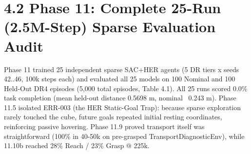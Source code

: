 \documentclass[11pt,a4paper,oneside]{book}
\begin{document}
\section{4.2 Phase 11: Complete 25-Run (2.5M-Step) Sparse Evaluation Audit}
Phase 11 trained 25 independent sparse SAC+HER agents (5 DR tiers x seeds 42..46, 100k steps each) and evaluated all 25 models on 100 Nominal and 100 Held-Out DR4 episodes (5,000 total episodes, Table 4.1). All 25 runs scored 0.0\% task completion (mean held-out distance 0.5698 m, nominal ~0.243 m). Phase 11.5 isolated ERR-003 (the HER Static-Goal Trap): because sparse exploration rarely touched the cube, future goals repeated initial resting coordinates, reinforcing passive hovering. Phase 11.9 proved transport itself was straightforward (100\% in 40-50k on pre-grasped TransportDiagnosticEnv), while 11.10b reached 28\% Reach / 23\% Grasp @ 225k.
\end{document}
